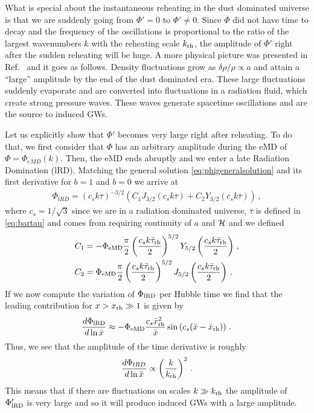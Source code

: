 \documentclass[a4paper,11pt]{article}
\numberwithin{equation}{section}
\begin{document}
What is special about the instantaneous reheating in the dust dominated universe is that we are suddenly going from $\Phi'=0$ to $\Phi'\neq 0$. Since $\Phi$ did not have time to decay and the frequency of the oscillations is proportional to the ratio of the largest wavenumbers $k$ with the reheating scale $k_{\rm rh}$, the amplitude of $\Phi'$ right after the sudden reheating will be huge.  A more physical picture was presented in Ref.~\cite{Inomata:2019ivs} and it goes as follows. Density fluctuations grow as $\delta\rho/\rho\propto a$ and attain a ``large'' amplitude by the end of the dust dominated era. These large fluctuations suddenly evaporate and are converted into fluctuations in a radiation fluid, which create strong pressure waves. These waves generate spacetime oscillations and are the source to induced GWs.

Let us explicitly show that $\Phi'$ becomes very large right after reheating. To do that, we first consider that $\Phi$ has an arbitrary amplitude during the eMD of $\Phi=\Phi_{eMD}(k)$. Then, the eMD ends abruptly and we enter a late Radiation Domination (lRD). Matching the general solution \eqref{eq:phigeneralsolution} and its first derivative for $b=1$ and $b=0$ we arrive at
\begin{align}
\Phi_{lRD}=(c_sk\bar\tau)^{-3/2}\left(C_1 J_{3/2}(c_sk\bar\tau)+C_2 Y_{3/2}(c_sk\bar\tau)\right)\,,
\end{align}
where $c_s=1/\sqrt{3}$ since we are in a radiation dominated universe, $\bar\tau$ is defined in \eqref{eq:bartau} and comes from requiring continuity of $a$ and $\cal H$ and we defined
\begin{align}
C_1&=-\Phi_{\rm eMD}\frac{\pi}{2}\left(\frac{c_sk\bar\tau_{\rm rh}}{2}\right)^{5/2}Y_{5/2}\left(\frac{c_sk\bar\tau_{\rm rh}}{2}\right)\,,\\
C_2&=\Phi_{\rm eMD}\frac{\pi}{2}\left(\frac{c_sk\bar\tau_{\rm rh}}{2}\right)^{5/2}J_{5/2}\left(\frac{c_sk\bar\tau_{\rm rh}}{2}\right)\,.
\end{align}
If we now compute the variation of $\Phi_{\rm lRD}$ per Hubble time we find that the leading contribution for $x> x_{\rm rh}\gg 1$ is given by
\begin{align}\label{eq:phiprimedust}
\frac{d\Phi_{\rm lRD}}{d\ln \bar x}\approx -\Phi_{\rm eMD}\frac{c_s\bar x_{\rm rh}^2}{\bar x}\sin \left(c_s(\bar x-\bar x_{\rm rh})\right)\,.
\end{align}
Thus, we see that the amplitude of the time derivative is roughly
\begin{align}
\frac{d\Phi_{lRD}}{d\ln \bar x}\propto\left(\frac{k}{k_{\rm rh}}\right)^2\,.
\end{align}
This means that if there are fluctuations on scales $k\gg k_{\rm rh}$ the amplitude of $\Phi_{\rm lRD}'$ is very large and so it will produce induced GWs with a large amplitude.
\end{document}
